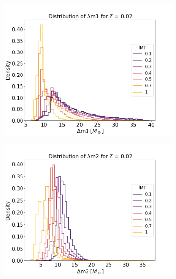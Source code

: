 \documentclass[preprint,12pt]{elsarticle}
\begin{document}
\\
\begin{figure}[ht]  
    \centering
    \begin{subfigure}[t]{0.45\textwidth}
        \centering
        \includegraphics[width=1\textwidth]{Images/diff1.png}
    \end{subfigure}
    \begin{subfigure}[t]{0.45\textwidth}
        \centering  
        \includegraphics[width=1\textwidth]{Images/diff2.png}
    \end{subfigure}
    \begin{subfigure}[t]{0.45\textwidth}
        \centering  

\end{subfigure}
\end{figure}
\end{document}
